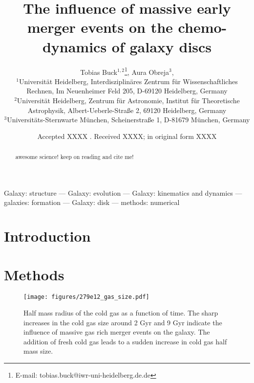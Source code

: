\documentclass[useAMS,usenatbib]{mnras}
\title[Early massive accretion events in a MW-mass galaxy]{The influence of massive early merger events on the chemo-dynamics of galaxy discs}
\author[T. Buck] {Tobias Buck$^{1,2}$\thanks{E-mail: tobias.buck@iwr-uni-heidelberg.de.de}, Aura Obreja$^{3}$, \etal \\  %
%
$^1$Universit\"at Heidelberg, Interdisziplin\"ares Zentrum f\"ur Wissenschaftliches Rechnen, Im Neuenheimer Feld 205, D-69120 Heidelberg, Germany\\
$^2$Universit\"at Heidelberg, Zentrum f\"ur Astronomie, Institut f\"ur Theoretische Astrophysik, Albert-Ueberle-Straße 2, 69120 Heidelberg, Germany\\
$^3$Universit\"ats-Sternwarte M\"unchen, Scheinerstraße 1, D-81679 M\"unchen, Germany%
}
\begin{document}
\date{Accepted XXXX . Received XXXX; in original form XXXX}

\pagerange{\pageref{firstpage}--\pageref{lastpage}} 

\maketitle

\label{firstpage}


\begin{abstract}
awesome science! keep on reading and cite me! 
\end{abstract}

\noindent
\begin{keywords}

Galaxy: structure --- Galaxy: evolution --- Galaxy: kinematics and dynamics --- galaxies:
  formation --- Galaxy: disk --- methods: numerical
 \end{keywords}



\section{Introduction} \label{sec:introduction}



\section{Methods} \label{sec:simulation}

\begin{figure}
    \begin{centering}
        \texttt{[image: figures/279e12\_gas\_size.pdf]}
        \caption{
            Half mass radius of the cold gas as a function of time. The sharp increases in the cold gas size around 2 Gyr and 9 Gyr indicate the influence of massive gas rich merger events on the galaxy. The addition of fresh cold gas leads to a sudden increase in cold gas half mass size.
        }
        \label{fig:half_mass}
    \end{centering}
\end{figure}
\end{document}
